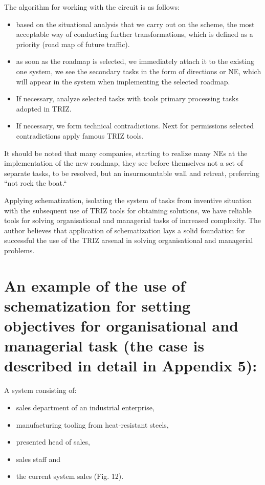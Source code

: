 \documentclass[11pt,a4paper]{book}
\begin{document}
The algorithm for working with the circuit is as follows:
\begin{itemize}
\item based on the situational analysis that we carry out on the scheme, the
  most acceptable way of conducting further transformations, which is defined
  as a priority (road map of future traffic).
\item as soon as the roadmap is selected, we immediately attach it to the
  existing one system, we see the secondary tasks in the form of directions or
  NE, which will appear in the system when implementing the selected roadmap.
\item If necessary, analyze selected tasks with tools primary processing tasks
  adopted in TRIZ.
\item If necessary, we form technical contradictions.  Next for permissions
  selected contradictions apply famous TRIZ tools.
\end{itemize}

It should be noted that many companies, starting to realize many NEs at the
implementation of the new roadmap, they see before themselves not a set of
separate tasks, to be resolved, but an insurmountable wall and retreat,
preferring “not rock the boat.“

Applying schematization, isolating the system
of tasks from inventive situation with the subsequent use of TRIZ tools for
obtaining solutions, we have reliable tools for solving organisational and
managerial tasks of increased complexity. The author believes that application
of schematization lays a solid foundation for successful the use of the TRIZ
arsenal in solving organisational and managerial problems.

\section[Applying schematization]{An example of the use of schematization for
  setting objectives for organisational and managerial task (the case is
  described in detail in Appendix 5):}

A system consisting of:
\begin{itemize}
\item sales department of an industrial enterprise,
\item manufacturing tooling from heat-resistant steels, 
\item presented head of sales,
\item sales staff and 
\item the current system sales (Fig. 12).
\end{itemize}
\end{document}
